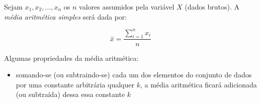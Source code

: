 \documentclass[
]{book}
\providecommand{\tightlist}{%
  \setlength{\itemsep}{0pt}\setlength{\parskip}{0pt}}
\begin{document}
\hfill\break

Sejam \(x_{1}, x_{2}, ..., x_{n}\) os \(n\) valores assumidos pela variável \(X\) (dados brutos). A \emph{média aritmética simples} será dada por:

\hfill\break

\[
\stackrel{-}{x}=\frac{\sum _{i=1}^{n}{x}_{i}}{n}
\]

\hfill\break

Algumas propriedades da média aritmética:

\hfill\break

\begin{itemize}
\tightlist
\item
  somando-se (ou subtraindo-se) cada um dos elementos do conjunto de dados por uma constante arbitrária qualquer \(k\), a média aritmética ficará adicionada (ou subtraída) dessa essa constante \(k\)
\end{itemize}

\hfill\break
\end{document}
